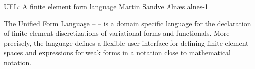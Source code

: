               {UFL: A finite element form language}
              {Martin Sandve Aln\ae{}s}
              {alnes-1}

\index{\ufl{}}


The Unified Form Language -- \ufl{} \citep{AlnaesA.Logg2009} --
is a domain specific language for the declaration of finite element
discretizations of variational forms and functionals. More precisely,
the language defines a flexible user interface for defining finite
element spaces and expressions for weak forms in a notation close to
mathematical notation.

